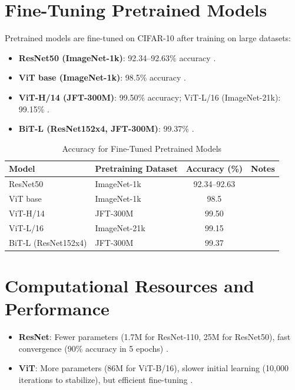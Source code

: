 \documentclass[UTF8]{report}
\theoremstyle{MyLineTheoremStyle} %
\theoremstyle{MyBlockTheoremStyle} %
\theoremstyle{MySubsubsectionStyle} %
\begin{document}
\section*{Fine-Tuning Pretrained Models}
Pretrained models are fine-tuned on CIFAR-10 after training on large datasets:
\begin{itemize}
    \item \textbf{ResNet50 (ImageNet-1k)}: 92.34–92.63\% accuracy \cite{sidthoviti}.
    \item \textbf{ViT base (ImageNet-1k)}: 98.5\% accuracy \cite{kentaroy47vit}.
    \item \textbf{ViT-H/14 (JFT-300M)}: 99.50\% accuracy; ViT-L/16 (ImageNet-21k): 99.15\% \cite{dosovitskiy2020image}.
    \item \textbf{BiT-L (ResNet152x4, JFT-300M)}: 99.37\% \cite{dosovitskiy2020image}.
\end{itemize}

\begin{table}[h]
\centering
\caption{Accuracy for Fine-Tuned Pretrained Models}
\begin{tabular}{llcc}
\toprule
Model & Pretraining Dataset & Accuracy (\%) & Notes \\
\midrule
ResNet50 & ImageNet-1k & 92.34–92.63 & \cite{sidthoviti} \\
ViT base & ImageNet-1k & 98.5 & \cite{kentaroy47vit} \\
ViT-H/14 & JFT-300M & 99.50 & \cite{dosovitskiy2020image} \\
ViT-L/16 & ImageNet-21k & 99.15 & \cite{dosovitskiy2020image} \\
BiT-L (ResNet152x4) & JFT-300M & 99.37 & \cite{dosovitskiy2020image} \\
\bottomrule
\end{tabular}
\end{table}

\section*{Computational Resources and Performance}
\begin{itemize}
    \item \textbf{ResNet}: Fewer parameters (1.7M for ResNet-110, 25M for ResNet50), fast convergence (90\% accuracy in 5 epochs) \cite{pytorchforum}.
    \item \textbf{ViT}: More parameters (86M for ViT-B/16), slower initial learning (10,000 iterations to stabilize), but efficient fine-tuning \cite{lightningvit, dosovitskiy2020image}.
\end{itemize}
\end{document}

